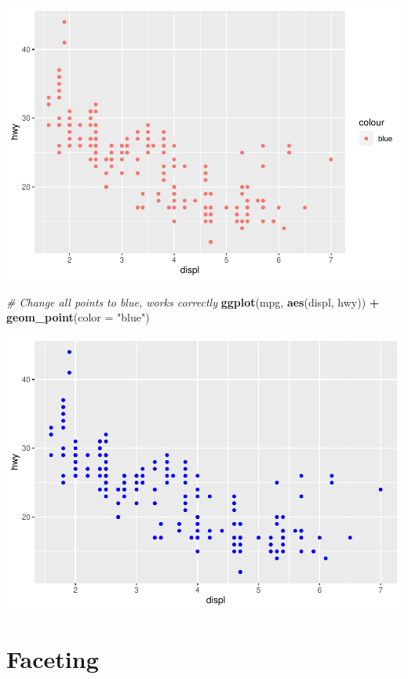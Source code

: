 \documentclass[
]{book}
\newenvironment{Shaded}{\begin{snugshade}}{\end{snugshade}}
\newcommand{\CommentTok}[1]{\textcolor[rgb]{0.56,0.35,0.01}{\textit{#1}}}
\newcommand{\DataTypeTok}[1]{\textcolor[rgb]{0.13,0.29,0.53}{#1}}
\newcommand{\KeywordTok}[1]{\textcolor[rgb]{0.13,0.29,0.53}{\textbf{#1}}}
\newcommand{\NormalTok}[1]{#1}
\newcommand{\OperatorTok}[1]{\textcolor[rgb]{0.81,0.36,0.00}{\textbf{#1}}}
\newcommand{\StringTok}[1]{\textcolor[rgb]{0.31,0.60,0.02}{#1}}
\begin{document}
\includegraphics{_main_files/figure-latex/unnamed-chunk-317-2.pdf}

\begin{Shaded}
\begin{Highlighting}[]
\CommentTok{# Change all points to blue, works correctly}
\KeywordTok{ggplot}\NormalTok{(mpg, }\KeywordTok{aes}\NormalTok{(displ, hwy)) }\OperatorTok{+}\StringTok{ }\KeywordTok{geom_point}\NormalTok{(}\DataTypeTok{color =} \StringTok{"blue"}\NormalTok{)}
\end{Highlighting}
\end{Shaded}

\includegraphics{_main_files/figure-latex/unnamed-chunk-317-3.pdf}

\hypertarget{faceting}{%
\section{Faceting}\label{faceting}}
\end{document}
